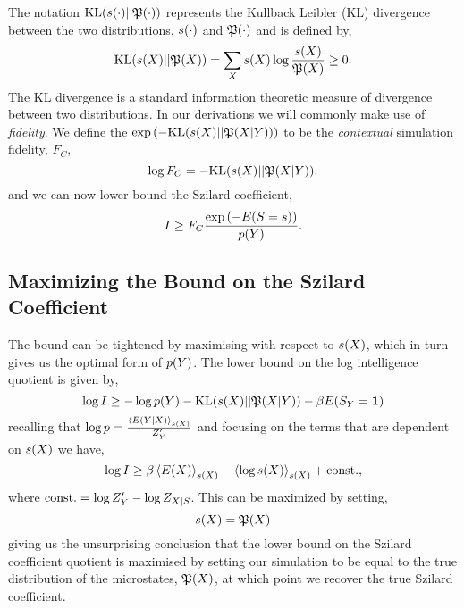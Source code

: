 \documentclass[]{article}
\begin{document}
The notation $\text{KL}(s(\cdot)||\mathfrak{P}(\cdot))$ represents the Kullback Leibler (KL) divergence\citep{Kullback-info51} between the two distributions, $s(\cdot)$ and $\mathfrak{P}(\cdot)$ and is defined by,
$$
\text{KL}(s(X) || \mathfrak{P}(X)) = \sum_X s(X) \log\frac{s(X)}{\mathfrak{P}(X)} \geq 0.
$$
The KL divergence is a standard information theoretic measure of divergence between two distributions. In our derivations we will commonly make use of \emph{fidelity}. We define the $\exp\left(-
\text{KL}(s(X)||\mathfrak{P}(X|Y))\right)$
to be the \emph{contextual} simulation fidelity, $F_C$,
\[
\log F_C =
-\text{KL}(s(X)||\mathfrak{P}(X|Y)).
\]
and we can now lower bound the Szilard coefficient,
\[
I \geq F_C \frac{\exp\left(-E(S=s)\right)}{p(Y)}.
\]


\subsection{Maximizing the Bound on the Szilard Coefficient}

The bound can be tightened by maximising with respect to $s(X)$, which in turn gives us the optimal form of $p(Y)$. The lower bound on the log intelligence quotient is given by,
\[
\log I \geq - \log p(Y) -\text{KL}(s(X)||\mathfrak{P}(X|Y)) - \beta E(S_Y = \textbf{1})
\]
recalling that $\log p = \frac{\left\langle E(Y|X) \right\rangle_{s(X)}}{Z^\prime_Y}$ and focusing on the terms that are dependent on $s(X)$ we have,
\[
\log I \geq \beta \left\langle E(X) \right\rangle_{s(X)} - \left\langle \log s(X) \right\rangle_{s(X)} + \text{const.},
\]
where $\text{const.} = \log Z^\prime_Y - \log Z_{X|S}$. This can be maximized by setting,
\[
s(X) = \mathfrak{P}(X)
\]
giving us the unsurprising conclusion that the lower bound on the Szilard coefficient quotient is maximised by setting our simulation to be equal to the true distribution of the microstates, $\mathfrak{P}(X)$, at which point we recover the true Szilard coefficient.
\end{document}
